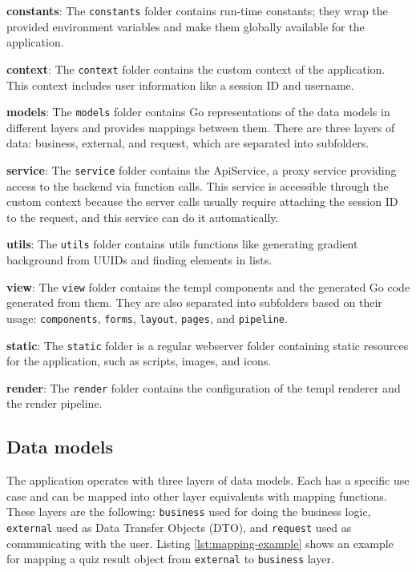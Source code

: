 \textbf{constants}: The \texttt{constants} folder contains run-time constants; they wrap the provided environment variables and make them globally available for the application.

\textbf{context}: The \texttt{context} folder contains the custom context of the application. This context includes user information like a session ID and username.

\textbf{models}: The \texttt{models} folder contains Go representations of the data models in different layers and provides mappings between them. There are three layers of data: business, external, and request, which are separated into subfolders.

\textbf{service}: The \texttt{service} folder contains the ApiService, a proxy service providing access to the backend via function calls. This service is accessible through the custom context because the server calls usually require attaching the session ID to the request, and this service can do it automatically.

\textbf{utils}: The \texttt{utils} folder contains utils functions like generating gradient background from UUIDs and finding elements in lists.

\textbf{view}: The \texttt{view} folder contains the templ components and the generated Go code generated from them. They are also separated into subfolders based on their usage: \texttt{components}, \texttt{forms}, \texttt{layout}, \texttt{pages}, and \texttt{pipeline}.

\textbf{static}: The \texttt{static} folder is a regular webserver folder containing static resources for the application, such as scripts, images, and icons.

\textbf{render}: The \texttt{render} folder contains the configuration of the templ renderer and the render pipeline.

\subsection{Data models}

The application operates with three layers of data models. Each has a specific use case and can be mapped into other layer equivalents with mapping functions. These layers are the following: \texttt{business} used for doing the business logic, \texttt{external} used as Data Transfer Objects (DTO), and \texttt{request} used as communicating with the user. Listing \ref{lst:mapping-example} shows an example for mapping a quiz result object from \texttt{external} to \texttt{business} layer.

